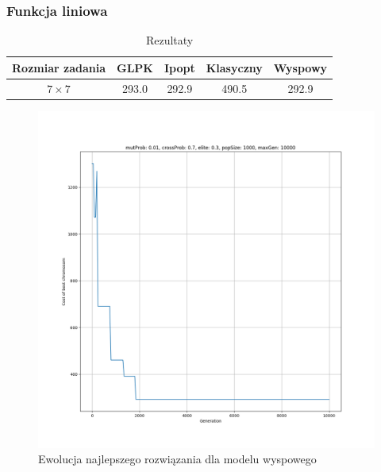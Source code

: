 \documentclass{beamer}
\begin{document}
\begin{frame}
    \frametitle{Funkcja liniowa}
     {
        \begin{table}
            \begin{center}
                \begin{tabular}{c||c|c|c|c}
                    Rozmiar zadania & GLPK & Ipopt & Klasyczny & Wyspowy \\ 
                    \hline
                    $7\times7$ & 293.0 & 292.9 & 490.5 & 292.9 \\
                \end{tabular}
            \end{center}
            \caption{Rezultaty}
        \end{table}
    }

     {
        \begin{figure}[ht]
            \centering
            \includegraphics[scale=0.2]{resultPlot_lin_island.png}
            \caption{Ewolucja najlepszego rozwiązania dla modelu wyspowego}
        \end{figure}    
    }
    

\end{frame}
\end{document}
